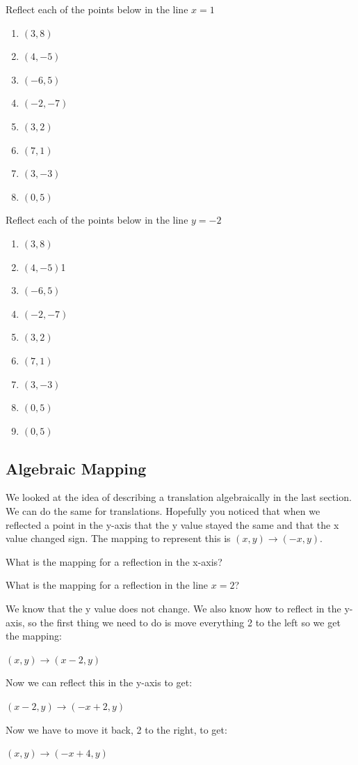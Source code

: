 	\bigskip

	Reflect each of the points below in the line $x = 1$
		\begin{enumerate}
			\item $(3, 8)$
			\item $(4, -5)$
			\item $(-6, 5)$
			\item $(-2, -7)$
			\item $(3, 2)$
			\item $(7, 1)$
			\item $(3, -3)$
			\item $(0, 5)$
		\end{enumerate}
		Reflect each of the points below in the line $y=-2$
			\begin{enumerate}
				\item $(3, 8)$
				\item $(4, -5)$1
				\item $(-6, 5)$
				\item $(-2, -7)$
				\item $(3, 2)$
				\item $(7, 1)$
				\item $(3, -3)$
				\item $(0, 5)$
				\item $(0, 5)$
			\end{enumerate}
	\subsection{Algebraic Mapping}
	We looked at the idea of describing a translation algebraically in the last section.  We can do the same for translations.  Hopefully you noticed that when we reflected a point in the y-axis that the y value stayed the same and that the x value changed sign.  The mapping to represent this is $(x, y) \rightarrow (-x, y)$.

	\bigskip

	What is the mapping for a reflection in the x-axis?

	\begin{exmp}
		What is the mapping for a reflection in the line $x = 2$?

	\bigskip

		We know that the y value does not change.  We also know how to reflect in the y-axis, so the first thing we need to do is move everything 2 to the left so we get the mapping:

	\bigskip

		$(x,y) \rightarrow (x-2, y)$

	\bigskip

		Now we can reflect this in the y-axis to get:

	\bigskip

		$(x-2,y) \rightarrow (-x+2, y)$

	\bigskip

		Now we have to move it back, 2 to the right, to get:

		$(x, y) \rightarrow (-x + 4, y)$
	\end{exmp}

